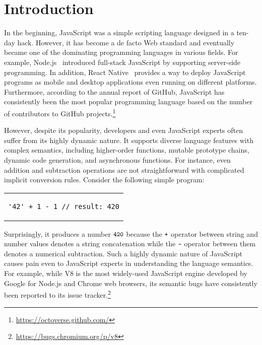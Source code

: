 \section{Introduction}\label{sec:intro}

In the beginning, JavaScript was a simple scripting language designed in a
ten-day hack. However, it has become a de facto Web standard and eventually
became one of the dominating programming languages in various fields. For
example, Node.js~\cite{nodejs} introduced full-stack JavaScript by supporting
server-side programming.  In addition, React Native~\cite{react-native} provides
a way to deploy JavaScript programs as mobile and desktop applications even
running on different platforms.  Furthermore, according to the annual report of
GitHub, JavaScript has consistently been the most popular programming language
based on the number of contributors to GitHub
projects.\footnote{\url{https://octoverse.github.com/}}

However, despite its popularity, developers and even JavaScript experts often
suffer from its highly dynamic nature.  It supports diverse language features
with complex semantics, including higher-order functions, mutable prototype
chains, dynamic code generation, and asynchronous functions.  For instance, even
addition and subtraction operations are not straightforward with complicated
implicit conversion rules.  Consider the following simple program:
\begin{center}
  \begin{tabular}{c}
    \begin{lstlisting}[style=JS]
'42' + 1 - 1 // result: 420
    \end{lstlisting}
  \end{tabular}
\end{center}
Surprisingly, it produces a number ${\small \texttt{420}}$ because the ${\small \texttt{+}}$
operator between string and number values denotes a string concatenation while
the ${\small \texttt{-}}$ operator between them denotes a numerical subtraction.  Such a
highly dynamic nature of JavaScript causes pain even to JavaScript experts in
understanding the language semantics.  For example, while V8 is the most
widely-used JavaScript engine developed by Google for Node.js and Chrome web
browsers, its semantic bugs have consistently been reported to its issue
tracker.\footnote{\url{https://bugs.chromium.org/p/v8}}

